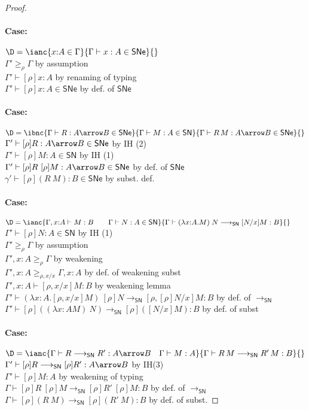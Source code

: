 \documentclass{article}
\newcommand{\ext}[1]{\geq_{#1}}
\newcommand{\SN}{\mathsf{SN}}
\newcommand{\SNe}{\mathsf{SNe}}
\newcommand{\redSN}{\longrightarrow_\SN}
\begin{document}
\begin{proof}
\paragraph{Case:} $\D = \ianc{x{:}A \in \Gamma}{\Gamma \vdash x : A \in \SNe}{} $
\\[1em]
$\Gamma' \ext {\rho} \Gamma$ \hfill by assumption \\
$\Gamma' \vdash [\rho]x : A$ \hfill by renaming of typing \\
$\Gamma' \vdash [\rho]x : A \in \SNe$ \hfill by def. of $\SNe$

\paragraph{Case:} $\D = \ibnc{\Gamma \vdash R : A \arrow B \in \SNe}{\Gamma \vdash M : A \in \SN}{\Gamma \vdash R\,M : A \arrow B \in \SNe}{} $
\\[1em]
$\Gamma' \vdash [\rho]R : A \arrow B \in \SNe$ \hfill by IH (2) \\
$\Gamma' \vdash [\rho]M : A \in \SN$ \hfill by IH (1) \\
$\Gamma' \vdash [\rho]R~[\rho]M : A \arrow B \in \SNe$ \hfill by def. of $\SNe$\\
$\gamma' \vdash [\rho](R~M) : B \in \SNe$ \hfill by subst. def.

\paragraph{Case:}$\D = \ianc{\Gamma, x{:}A \vdash M : B \qquad \Gamma \vdash N : A \in \SN}{\Gamma \vdash (\lambda x{:}A.M)\;N \redSN [N/x]M : B}{} \qquad$
\\[1em]
$\Gamma' \vdash [\rho]N : A\in \SN$ \hfill by IH (1) \\
$\Gamma' \ext{\rho} \Gamma$ \hfill by assumption \\
$\Gamma', x{:}A \ext{\rho} \Gamma$ \hfill by weakening\\
$\Gamma', x{:}A \ext{\rho, x/x} \Gamma, x{:}A$ \hfill by def. of weakening subst\\
$\Gamma', x{:}A \vdash [\rho, x/x]M : B$ \hfill by weakening lemma \\
$\Gamma' \vdash (\lambda x{:}A.[\rho, x/x]M)~[\rho]N \redSN [\rho, [\rho]N/x]M : B$ \hfill by def. of $\redSN$\\
$\Gamma' \vdash [\rho]((\lambda x{:}A M)~N) \redSN [\rho]([N/x]M) : B$ \hfill by def. of subst

\paragraph{Case:}$\D = \ianc{\Gamma \vdash R \redSN R' : A \arrow B \quad \Gamma \vdash M : A}{\Gamma \vdash R\,M \redSN R'\,M : B}{}$\\[1em]
$\Gamma' \vdash [\rho]R \redSN [\rho]R': A \arrow B$ \hfill by IH(3) \\
$\Gamma' \vdash [\rho]M : A$ \hfill by weakening of typing \\
$\Gamma \vdash [\rho]R~[\rho]M \redSN [\rho]R'~[\rho]M : B$ \hfill by def. of $\redSN$\\
$\Gamma \vdash [\rho](R~M) \redSN [\rho](R'~M) : B$ \hfill by def. of subst.


\end{proof}
\end{document}
